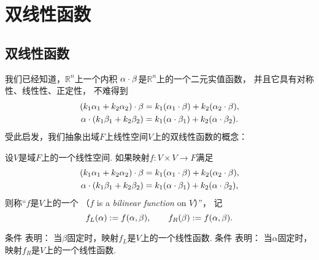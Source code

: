 \section{双线性函数}
\subsection{双线性函数}
我们已经知道，\(\mathbb{R}^n\)上一个内积
\(\alpha\cdot\beta\)是\(\mathbb{R}^n\)上的一个二元实值函数，
并且它具有对称性、线性性、正定性，
不难得到\begin{gather*}
	(k_1\alpha_1+k_2\alpha_2)\cdot\beta
	= k_1(\alpha_1\cdot\beta)
	+ k_2(\alpha_2\cdot\beta), \\
	\alpha\cdot(k_1\beta_1+k_2\beta_2)
	= k_1(\alpha\cdot\beta_1)
	+ k_2(\alpha\cdot\beta_2).
\end{gather*}
受此启发，我们抽象出域\(F\)上线性空间\(V\)上的双线性函数的概念：
\begin{definition}
设\(V\)是域\(F\)上的一个线性空间.
如果映射\(f\colon V \times V \to F\)满足\begin{gather}
	(k_1\alpha_1+k_2\alpha_2)\cdot\beta
	= k_1(\alpha_1\cdot\beta)
	+ k_2(\alpha_2\cdot\beta),
		\label{equation:双线性函数.双线性函数判定条件1} \\
	\alpha\cdot(k_1\beta_1+k_2\beta_2)
	= k_1(\alpha\cdot\beta_1)
	+ k_2(\alpha\cdot\beta_2),
		\label{equation:双线性函数.双线性函数判定条件2}
\end{gather}
则称“\(f\)是\(V\)上的一个%
（\(f\) is a \emph{bilinear function} on \(V\)）”，
记\begin{equation*}
	f_L(\alpha) := f(\alpha,\beta),
	\qquad
	f_R(\beta) := f(\alpha,\beta).
\end{equation*}
\end{definition}
\begin{remark}
条件  表明：
当\(\beta\)固定时，映射\(f_L\)是\(V\)上的一个线性函数.
条件  表明：
当\(\alpha\)固定时，映射\(f_R\)是\(V\)上的一个线性函数.
\end{remark}

